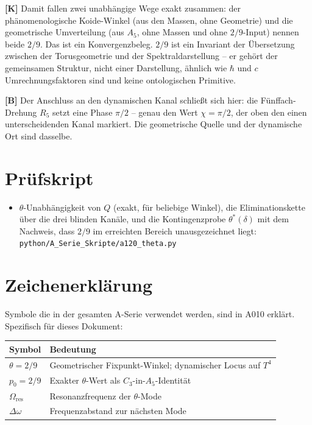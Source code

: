 \textbf{[K]} Damit fallen zwei unabhängige Wege exakt zusammen: der
phänomenologische Koide-Winkel (aus den Massen, ohne Geometrie) und die
geometrische Umverteilung (aus $A_5$, ohne Massen und ohne $2/9$-Input) nennen
beide $2/9$. Das ist ein Konvergenzbeleg. $2/9$ ist ein Invariant der
Übersetzung zwischen der Torusgeometrie und der Spektraldarstellung -- er gehört
der gemeinsamen Struktur, nicht einer Darstellung, ähnlich wie $\hbar$ und $c$
Umrechnungsfaktoren sind und keine ontologischen Primitive.

\textbf{[B]} Der Anschluss an den dynamischen Kanal schließt sich hier: die
Fünffach-Drehung $R_5$ setzt eine Phase $\pi/2$ -- genau den Wert $\chi = \pi/2$,
der oben den einen unterscheidenden Kanal markiert. Die geometrische Quelle und
der dynamische Ort sind dasselbe.

\section{Prüfskript}

\begin{itemize}
  \item $\theta$-Unabhängigkeit von $Q$ (exakt, für beliebige Winkel), die
    Eliminationskette über die drei blinden Kanäle, und die Kontingenzprobe
    $\theta^*(\delta)$ mit dem Nachweis, dass $2/9$ im erreichten Bereich
    unausgezeichnet liegt:
    \texttt{python/A\_Serie\_Skripte/a120\_theta.py}
\end{itemize}


\section{Zeichenerklärung}

Symbole die in der gesamten A-Serie verwendet werden, sind in A010 erklärt.
Spezifisch für dieses Dokument:

\begin{center}
\renewcommand{\arraystretch}{1.3}
{\small\begin{tabular}{lp{9cm}}
\toprule
Symbol & Bedeutung \\
\midrule
$\theta = 2/9$ & Geometrischer Fixpunkt-Winkel; dynamischer Locus auf $T^4$ \\
$p_0 = 2/9$ & Exakter $\theta$-Wert als $C_3$-in-$A_5$-Identität \\
$\Omega_\text{res}$ & Resonanzfrequenz der $\theta$-Mode \\
$\Delta\omega$ & Frequenzabstand zur nächsten Mode \\
\bottomrule
\end{tabular}}
\renewcommand{\arraystretch}{1.0}
\end{center}

